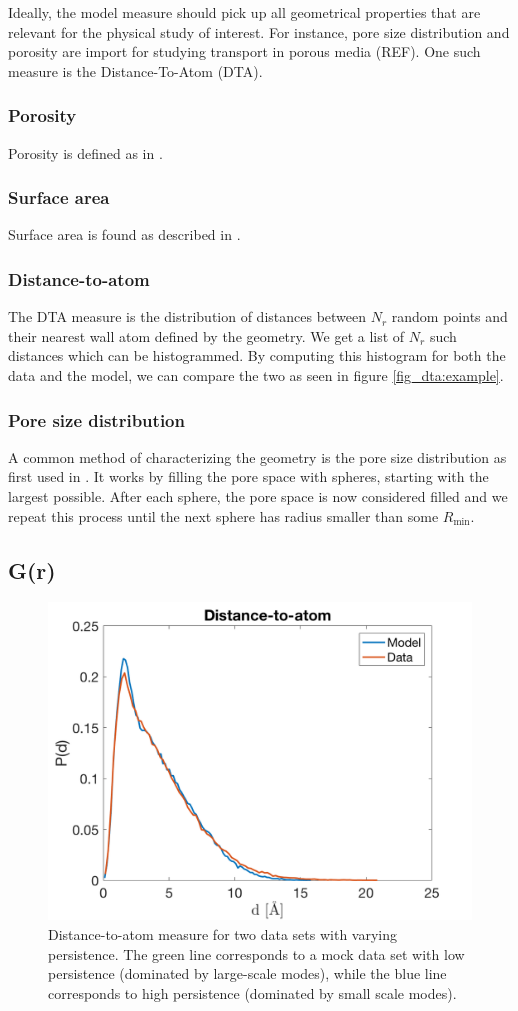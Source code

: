 \documentclass[aps,pre,twocolumn,letterpaper,floatfix,showpacs]{revtex4}
\begin{document}
Ideally, the model measure should pick up all geometrical properties that are relevant for the physical study of interest. For instance, pore size distribution and porosity are import for studying transport in porous media (REF). One such measure is the Distance-To-Atom (DTA).

\subsubsection{Porosity}
Porosity is defined as in \cite{gelb1998characterization}.

\subsubsection{Surface area}
Surface area is found as described in \cite{gelb1998characterization}.

\subsubsection{Distance-to-atom}
The DTA measure is the distribution of distances between $N_r$ random points and their nearest wall atom defined by the geometry. We get a list of $N_r$ such distances which can be histogrammed. By computing this histogram for both the data and the model, we can compare the two as seen in figure \ref{fig_dta:example}. 

\subsubsection{Pore size distribution}
A common method of characterizing the geometry is the pore size distribution as first used in \cite{gelb1999pore}. It works by filling the pore space with spheres, starting with the largest possible. After each sphere, the pore space is now considered filled and we repeat this process until the next sphere has radius smaller than some $R_\text{min}$. 

\subsection{G(r)}

\begin{figure}[htb!]
\includegraphics[width=.45\textwidth]{DTA.png}
\caption{Distance-to-atom measure for two data sets with varying persistence. The green line corresponds to a mock data set with low persistence (dominated by large-scale modes), while the blue line corresponds to high persistence (dominated by small scale modes). }
\label{fig:dta_example}
\end{figure}
\end{document}
